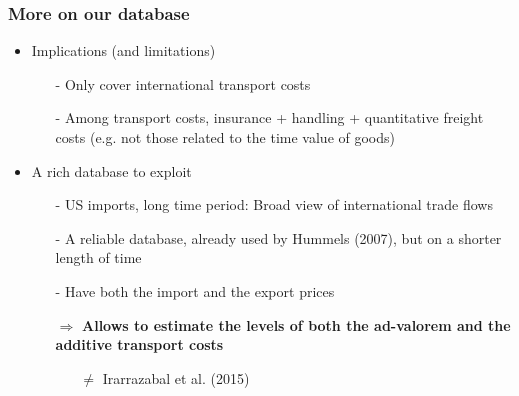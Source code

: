 \documentclass[10 pt,Helvetica, french]{beamer}
\begin{document}

\begin{frame}
\frametitle{More on our database}
\begin{itemize}
\item Implications (and limitations) \vspace{0.1cm}
\begin{itemize}
\item[-] Only cover international transport costs \vspace{0.1cm}
\item[-] Among transport costs, insurance + handling + quantitative freight costs (e.g. not those related to the time value of goods) \vspace{0.1cm}
\pause
\end{itemize}
\item A rich database to exploit \vspace{0.1cm}
\begin{itemize}
\item[-] US imports, long time period: Broad view of international trade flows \vspace{0.1cm}
\item[-] A reliable database, already used by Hummels (2007), but on a shorter length of time \vspace{0.1cm}
\item[-] Have both the import and the export prices  \vspace{0.1cm}
\pause

\item[$\Rightarrow$] \textbf{Allows to estimate the levels of both the ad-valorem and the additive transport costs} \vspace{0.1cm}
\begin{itemize}
\item[$\neq$] Irarrazabal et al. (2015)
\end{itemize}
\end{itemize}
\end{itemize}
\end{frame}

\end{document}
